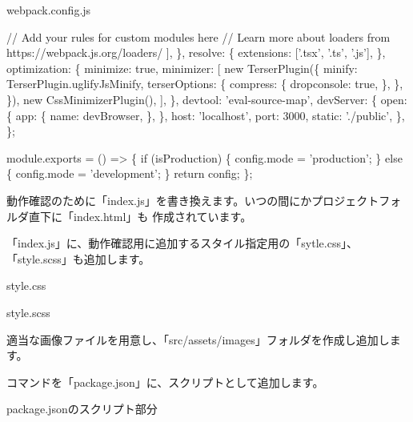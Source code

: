 \begin{starterprogram}[]{webpack.config.js}
{        // Add your rules for custom modules here
        // Learn more about loaders from https://webpack.js.org/loaders/
      ],
    \},
    resolve: \{
      extensions: ['.tsx', '.ts', '.js'],
    \},
    optimization: \{
      minimize: true,
      minimizer: [
        new TerserPlugin(\{
          minify: TerserPlugin.uglifyJsMinify,
          terserOptions: \{
            compress: \{
              drop\textunderscore{}console: true,
            \},
          \},
        \}),
        new CssMinimizerPlugin(),
      ],
    \},
    devtool: 'eval{-}source{-}map',
    devServer: \{
      open: \{
        app: \{
          name: devBrowser,
        \},
      \},
      host: 'localhost',
      port: 3000,
      static: './public',
    \},
  \};

  module.exports = () =\textgreater{} \{
    if (isProduction) \{
      config.mode = 'production';
    \} else \{
      config.mode = 'development';
    \}
    return config;
  \};
}\end{starterprogram}

動作確認のために「index.js」を書き換えます。いつの間にかプロジェクトフォルダ直下に「index.html」も
作成されています。

\vspace*{\baselineskip}

「index.js」に、動作確認用に追加するスタイル指定用の「sytle.css」、「style.scss」も追加します。

\def\startercodeblockfontsize{}
\begin{starterprogram}[]{style.css}\end{starterprogram}
\def\startercodeblockfontsize{}
\begin{starterprogram}[]{style.scss}\end{starterprogram}
\vspace*{\baselineskip}

適当な画像ファイルを用意し、「src/assets/images」フォルダを作成し追加します。

\vspace*{\baselineskip}

コマンドを「package.json」に、スクリプトとして追加します。

\def\startercodeblockfontsize{}
\begin{starterprogram}[]{package.jsonのスクリプト部分}\end{starterprogram}

